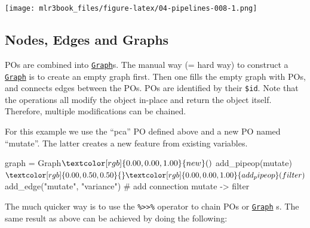 \documentclass[]{article}
\newenvironment{Shaded}{}{}
\newcommand{\CommentTok}[1]{\textcolor[rgb]{0.00,0.50,0.00}{#1}}
\newcommand{\KeywordTok}[1]{\textcolor[rgb]{0.00,0.00,1.00}{#1}}
\newcommand{\NormalTok}[1]{#1}
\newcommand{\OperatorTok}[1]{#1}
\newcommand{\StringTok}[1]{\textcolor[rgb]{0.00,0.50,0.50}{#1}}
\renewenvironment{Shaded} {\begin{snugshade}\small} {\end{snugshade}}
\begin{document}
\texttt{[image: mlr3book\_files/figure-latex/04-pipelines-008-1.png]}

\hypertarget{pipe-nodes-edges-graphs}{%
\subsection{Nodes, Edges and Graphs}\label{pipe-nodes-edges-graphs}}

POs are combined into \href{https://mlr3pipelines.mlr-org.com/reference/Graph.html}{\texttt{Graph}}s.
The manual way (= hard way) to construct a \href{https://mlr3pipelines.mlr-org.com/reference/Graph.html}{\texttt{Graph}} is to create an empty graph first.
Then one fills the empty graph with POs, and connects edges between the POs.
POs are identified by their \texttt{\$id}.
Note that the operations all modify the object in-place and return the object itself.
Therefore, multiple modifications can be chained.

For this example we use the ``pca'' PO defined above and a new PO named ``mutate''.
The latter creates a new feature from existing variables.

\begin{Shaded}
\end{Shaded}

\begin{Shaded}
\begin{Highlighting}[]
\NormalTok{graph =}\StringTok{ }\NormalTok{Graph}\OperatorTok{$}\KeywordTok{new}\NormalTok{()}\OperatorTok{$}
\StringTok{  }\KeywordTok{add_pipeop}\NormalTok{(mutate)}\OperatorTok{$}
\StringTok{  }\KeywordTok{add_pipeop}\NormalTok{(filter)}\OperatorTok{$}
\StringTok{  }\KeywordTok{add_edge}\NormalTok{(}\StringTok{"mutate"}\NormalTok{, }\StringTok{"variance"}\NormalTok{)  }\CommentTok{# add connection mutate -> filter}
\end{Highlighting}
\end{Shaded}

The much quicker way is to use the \texttt{\%\textgreater{}\textgreater{}\%} operator to chain POs or \href{https://mlr3pipelines.mlr-org.com/reference/Graph.html}{\texttt{Graph}} s.
The same result as above can be achieved by doing the following:

\begin{Shaded}
\end{Shaded}
\end{document}
